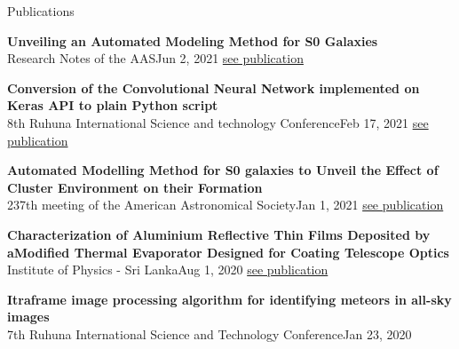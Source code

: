 \documentclass[
	11pt, %
]{./assets/resume} %
\begin{document}





\begin{rSection}{Publications}

	\textbf{Unveiling an Automated Modeling Method for S0 Galaxies} \\
	{Research Notes of the AAS}{Jun 2, 2021}
	\href{https://iopscience.iop.org/article/10.3847/2515-5172/ac0dc0}{see publication}

	\textbf{Conversion of the Convolutional Neural Network implemented on Keras API to plain Python script} \\
	{8th Ruhuna International Science and technology Conference}{Feb 17, 2021}
	\href{https://www.researchgate.net/publication/360994589_Conversion_of_the_Convolutional_Neural_Network_implemented_on_Keras_API_to_plain_Python_script}{see publication}

	\textbf{Automated Modelling Method for S0 galaxies to Unveil the Effect of Cluster Environment on their Formation} \\
	{237th meeting of the American Astronomical Society}{Jan 1, 2021}
	\href{https://www.researchgate.net/publication/348993949_Automated_Modelling_Method_for_S0_galaxies_to_Unveil_the_Effect_of_Cluster_Environment_on_their_Formation}{see publication}
	
	\textbf{Characterization of Aluminium Reflective Thin Films Deposited by aModified Thermal Evaporator Designed for Coating Telescope Optics} \\
	{Institute of Physics - Sri Lanka}{Aug 1, 2020}
	\href{https://www.researchgate.net/publication/344312143_Characterization_of_Aluminium_Reflective_Thin_Films_Deposited_by_a_Modified_Thermal_Evaporator_Designed_for_Coating_Telescope_Optics}{see publication}

	\textbf{Itraframe image processing algorithm for identifying meteors in all-sky images} \\
	{7th Ruhuna International Science and Technology Conference}{Jan 23, 2020}


\end{rSection}
\end{document}
